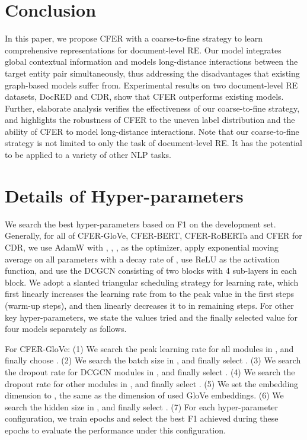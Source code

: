 \documentclass{article}
\begin{document}
\section{Conclusion}

In this paper, we propose CFER with a coarse-to-fine strategy to learn comprehensive representations for document-level RE. 
Our model integrates global contextual information and models long-distance interactions between the target entity pair simultaneously, thus addressing the disadvantages that existing graph-based models suffer from. 
Experimental results on two document-level RE datasets, DocRED and CDR, show that CFER outperforms existing models. 
Further, elaborate analysis verifies the effectiveness of our coarse-to-fine strategy, and highlights the robustness of CFER to the uneven label distribution and the ability of CFER to model long-distance interactions. 
Note that our coarse-to-fine strategy is not limited to only the task of document-level RE. 
It has the potential to be applied to a variety of other NLP tasks.

\small
 


\appendix
\appendixpage

\section{Details of Hyper-parameters}

We search the best hyper-parameters based on F1 on the development set. 
Generally, for all of CFER-GloVe, CFER-BERT, CFER-RoBERTa and CFER for CDR, we use AdamW with , , ,  as the optimizer, apply exponential moving average on all parameters with a decay rate of , use ReLU as the activation function, and use the DCGCN consisting of two blocks with 4 sub-layers in each block. 
We adopt a slanted triangular scheduling strategy for learning rate, which first linearly increases the learning rate from  to the peak value in the first  steps (warm-up steps), and then linearly decreases it to  in remaining steps. 
For other key hyper-parameters, we state the values tried and the finally selected value for four models separately as follows. 

For CFER-GloVe: 
(1) We search the peak learning rate for all modules in , and finally choose . 
(2) We search the batch size in , and finally select .
(3) We search the dropout rate for DCGCN modules in , and finally select .
(4) We search the dropout rate for other modules in , and finally select .
(5) We set the embedding dimension to , the same as the dimension of used GloVe embeddings. 
(6) We search the hidden size in , and finally select . 
(7) For each hyper-parameter configuration, we train  epochs and select the best F1 achieved during these  epochs to evaluate the performance under this configuration. 
\end{document}
